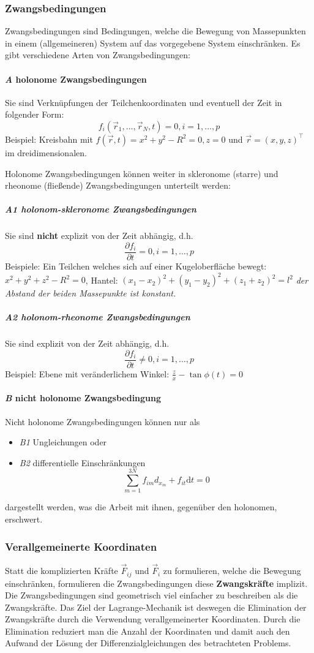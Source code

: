 \documentclass[oneside]{book}
\theoremstyle{definition}
\renewcommand{\d}{\mathrm d}
\begin{document}
\subsubsection{Zwangsbedingungen} 
Zwangsbedingungen sind Bedingungen, welche die Bewegung von Massepunkten in einem (allgemeineren) System auf das vorgegebene System einschränken. Es gibt verschiedene Arten von Zwangsbedingungen:

\paragraph{\textit{A} holonome Zwangsbedingungen} Sie sind Verknüpfungen der Teilchenkoordinaten und eventuell der
Zeit in folgender Form: $$f_i(\vec{r}_1, \dots, \vec{r}_N, t) = 0, i = 1, \dots, p$$ 
Beispiel: Kreisbahn mit $f(\vec{r}, t) = x^2 + y^2 - R^2 = 0, z = 0$ und $\vec{r} = (x,y,z)^\top$ im dreidimensionalen.

Holonome Zwangsbedingungen können weiter in skleronome (starre) und rheonome (fließende) Zwangsbedingungen unterteilt werden:

\subparagraph{\textit{A1} holonom-skleronome Zwangsbedingungen} Sie sind \textbf{nicht} explizit von der Zeit abhängig, d.h.
$$ \frac{\partial f_i}{\partial t} = 0, i = 1, \dots, p$$
Beispiele: Ein Teilchen welches sich auf einer Kugeloberfläche bewegt: $x^2 + y^2 + z^2 - R^2 = 0$, Hantel: $(x_1 - x_2)^2 + (y_1 - y_2)^2 + (z_1 + z_2)^2 = l^2$ \textit{der Abstand der beiden Massepunkte ist konstant.}

\subparagraph{\textit{A2} holonom-rheonome Zwangsbedingungen} Sie sind explizit von der Zeit abhängig, d.h.
$$ \frac{\partial f_i}{\partial t} \neq 0, i = 1, \dots, p$$
Beispiel: Ebene mit veränderlichem Winkel: $\frac{z}{x} - \tan{\phi(t)} = 0$


\paragraph{\textit{B} nicht holonome Zwangsbedingung}
Nicht holonome Zwangsbedingungen können nur als 
\begin{itemize}
	\item \textit{B1} Ungleichungen oder
	\item \textit{B2} differentielle Einschränkungen
	$$ \sum_{m = 1}^{3N} f_{im} d_{x_m} + f_{it} \d t = 0$$
\end{itemize}
dargestellt werden, was die Arbeit mit ihnen, gegenüber den holonomen, erschwert. 

\subsubsection{Verallgemeinerte Koordinaten}
Statt die komplizierten Kräfte $\vec{F}_{ij}$ und $\vec{F}_i$ zu formulieren, welche die Bewegung einschränken, formulieren die Zwangsbedingungen diese \textbf{Zwangskräfte} implizit.
Die Zwangsbedingungen sind geometrisch viel einfacher zu beschreiben als die Zwangskräfte. Das Ziel der Lagrange-Mechanik ist deswegen die Elimination der Zwangskräfte durch die Verwendung verallgemeinerter Koordinaten. Durch die Elimination reduziert man die Anzahl der Koordinaten und damit auch den Aufwand der Lösung der Differenzialgleichungen des betrachteten Problems.
\end{document}
